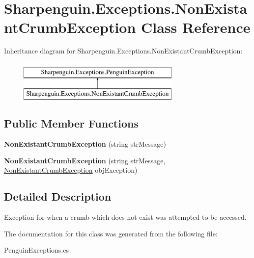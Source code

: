 \hypertarget{classSharpenguin_1_1Exceptions_1_1NonExistantCrumbException}{\section{Sharpenguin.\-Exceptions.\-Non\-Existant\-Crumb\-Exception Class Reference}
\label{classSharpenguin_1_1Exceptions_1_1NonExistantCrumbException}
}
Inheritance diagram for Sharpenguin.\-Exceptions.\-Non\-Existant\-Crumb\-Exception\-:\begin{figure}[H]
\begin{center}
\leavevmode
\includegraphics[height=2.000000cm]{classSharpenguin_1_1Exceptions_1_1NonExistantCrumbException}
\end{center}
\end{figure}
\subsection*{Public Member Functions}
\begin{DoxyCompactItemize}
\item 
\hypertarget{classSharpenguin_1_1Exceptions_1_1NonExistantCrumbException_af8bda657fe2945c89dafe8f0c5cce170}{{\bfseries Non\-Existant\-Crumb\-Exception} (string str\-Message)}\label{classSharpenguin_1_1Exceptions_1_1NonExistantCrumbException_af8bda657fe2945c89dafe8f0c5cce170}

\item 
\hypertarget{classSharpenguin_1_1Exceptions_1_1NonExistantCrumbException_a39ea74af873c1a57483b7a5062be9e8d}{{\bfseries Non\-Existant\-Crumb\-Exception} (string str\-Message, \hyperlink{classSharpenguin_1_1Exceptions_1_1NonExistantCrumbException}{Non\-Existant\-Crumb\-Exception} obj\-Exception)}\label{classSharpenguin_1_1Exceptions_1_1NonExistantCrumbException_a39ea74af873c1a57483b7a5062be9e8d}

\end{DoxyCompactItemize}


\subsection{Detailed Description}
Exception for when a crumb which does not exist was attempted to be accessed. 

The documentation for this class was generated from the following file\-:\begin{DoxyCompactItemize}
\item 
Penguin\-Exceptions.\-cs\end{DoxyCompactItemize}
